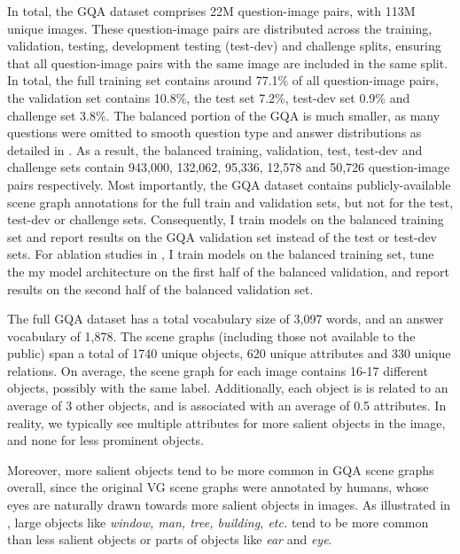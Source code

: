



In total, the GQA dataset comprises 22M question-image pairs, with 113M unique images. These question-image pairs are distributed across the training, validation, testing, development testing (test-dev) and challenge splits, ensuring that all question-image pairs with the same image are included in the same split. In total, the full training set contains around 77.1\% of all question-image pairs, the validation set contains 10.8\%, the test set 7.2\%, test-dev set 0.9\% and challenge set 3.8\%. The balanced portion of the GQA is much smaller, as many questions were omitted to smooth question type and answer distributions as detailed in \subsectionautorefname{ \ref{subsec:lanauge_priors_in_vqa_datasets}}. As a result, the balanced training, validation, test, test-dev and challenge sets contain 943,000, 132,062, 95,336, 12,578 and 50,726 question-image pairs respectively. Most importantly, the GQA dataset contains publicly-available scene graph annotations for the full train and validation sets, but not for the test, test-dev or challenge sets. Consequently, I train models on the balanced training set and report results on the GQA validation set instead of the test or test-dev sets. For ablation studies in \sectionautorefname{ \ref{sec:ablation_studies}}, I train models on the balanced training set, tune the my model architecture on the first half of the balanced validation, and report results on the second half of the balanced validation set.

The full GQA dataset has a total vocabulary size of 3,097 words, and an answer vocabulary of 1,878. The scene graphs (including those not available to the public) span a total of 1740 unique objects, 620 unique attributes and 330 unique relations. On average, the scene graph for each image contains 16-17 different objects, possibly with the same label. Additionally, each object is is related to an average of 3 other objects, and is associated with an average of 0.5 attributes. In reality, we typically see multiple attributes for more salient objects in the image, and none for less prominent objects.

Moreover, more salient objects tend to be more common in GQA scene graphs overall, since the original VG scene graphs were annotated by humans, whose eyes are naturally drawn towards more salient objects in images. As illustrated in \figureautorefname{ \ref{fig:gqa_scene_graph_object_relation_attribute_distribution}}, large objects like \textit{window, man, tree, building, etc.} tend to be more common than less salient objects or parts of objects like \textit{ear} and \textit{eye}.


